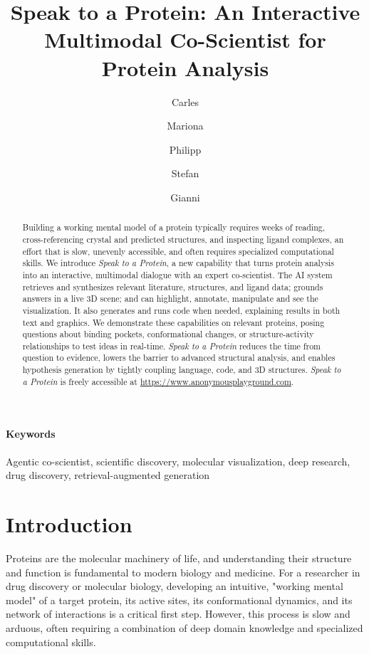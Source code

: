 \documentclass{article}
\title{Speak to a Protein: An Interactive Multimodal Co-Scientist for Protein Analysis} %
\author{Carles}
\author{Mariona}
\author{Philipp}
\author{Stefan}
\author{Gianni}
\begin{document}
\maketitle

\begin{abstract}
Building a working mental model of a protein typically requires weeks of reading, cross-referencing crystal and predicted structures, and inspecting ligand complexes, an effort that is slow, unevenly accessible, and often requires specialized computational skills. We introduce \emph{Speak to a Protein}, a new capability that turns protein analysis into an interactive, multimodal dialogue with an expert co-scientist. The AI system retrieves and synthesizes relevant literature, structures, and ligand data; grounds answers in a live 3D scene; and can highlight, annotate, manipulate and see the visualization. It also generates and runs code when needed, explaining results in both text and graphics.
We demonstrate these capabilities on relevant proteins, posing questions about binding pockets, conformational changes, or structure-activity relationships to test ideas in real-time. \emph{Speak to a Protein} reduces the time from question to evidence, lowers the barrier to advanced structural analysis, and enables hypothesis generation by tightly coupling language, code, and 3D structures. \emph{Speak to a Protein} is freely accessible at \url{https://www.anonymousplayground.com}.
\end{abstract}

\paragraph{Keywords} Agentic co-scientist, scientific discovery, molecular visualization, deep research, drug discovery, retrieval-augmented generation

\section{Introduction}\label{sec:intro}
Proteins are the molecular machinery of life, and understanding their structure and function is fundamental to modern biology and medicine. For a researcher in drug discovery or molecular biology, developing an intuitive, "working mental model" of a target protein, its active sites, its conformational dynamics, and its network of interactions is a critical first step. However, this process is slow and arduous, often requiring a combination of deep domain knowledge and specialized computational skills.
\end{document}
